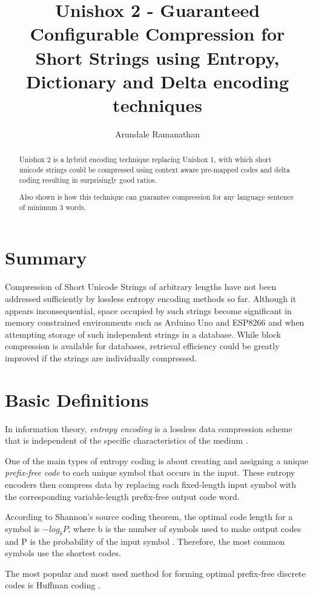 \documentclass[]{article}
\title{Unishox 2 - Guaranteed Configurable Compression for Short Strings using Entropy, Dictionary and Delta encoding techniques}
\author{Arundale Ramanathan}
\begin{document}
\maketitle

\begin{abstract}
Unishox 2 is a hybrid encoding technique replacing Unishox 1, with which short unicode strings could be compressed using context aware pre-mapped codes and delta coding resulting in surprisingly good ratios.

Also shown is how this technique can guarantee compression for any language sentence of minimum 3 words.
\end{abstract}

\section{Summary}

Compression of Short Unicode Strings of arbitrary lengths have not been addressed sufficiently by lossless entropy encoding methods so far.  Although it appears inconsequential, space occupied by such strings become significant in memory constrained environments such as Arduino Uno and ESP8266 and when attempting storage of such independent strings in a database. While block compression is available for databases, retrieval efficiency could be greatly improved if the strings are individually compressed.

\section{Basic Definitions}

In information theory, \emph{entropy encoding} is a lossless data compression scheme that is independent of the specific characteristics of the medium \cite{1}.

One of the main types of entropy coding is about creating and assigning a unique \emph{prefix-free code} to each unique symbol that occurs in the input. These entropy encoders then compress data by replacing each fixed-length input symbol with the corresponding variable-length prefix-free output code word.

According to Shannon's source coding theorem, the optimal code length for a symbol is $-log_bP$, where b is the number of symbols used to make output codes and P is the probability of the input symbol \cite{2}. Therefore, the most common symbols use the shortest codes.

The most popular and most used method for forming optimal prefix-free discrete codes is Huffman coding \cite{3}.
\end{document}
